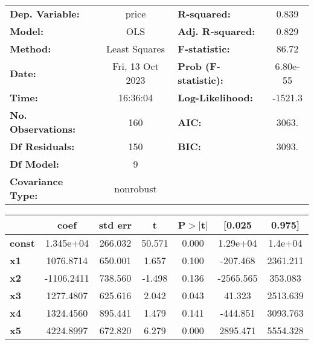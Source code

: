 \begin{center}
\begin{tabular}{lclc}
\toprule
\textbf{Dep. Variable:}    &      price       & \textbf{  R-squared:         } &     0.839   \\
\textbf{Model:}            &       OLS        & \textbf{  Adj. R-squared:    } &     0.829   \\
\textbf{Method:}           &  Least Squares   & \textbf{  F-statistic:       } &     86.72   \\
\textbf{Date:}             & Fri, 13 Oct 2023 & \textbf{  Prob (F-statistic):} &  6.80e-55   \\
\textbf{Time:}             &     16:36:04     & \textbf{  Log-Likelihood:    } &   -1521.3   \\
\textbf{No. Observations:} &         160      & \textbf{  AIC:               } &     3063.   \\
\textbf{Df Residuals:}     &         150      & \textbf{  BIC:               } &     3093.   \\
\textbf{Df Model:}         &           9      & \textbf{                     } &             \\
\textbf{Covariance Type:}  &    nonrobust     & \textbf{                     } &             \\
\bottomrule
\end{tabular}
\begin{tabular}{lcccccc}
               & \textbf{coef} & \textbf{std err} & \textbf{t} & \textbf{P$> |$t$|$} & \textbf{[0.025} & \textbf{0.975]}  \\
\midrule
\textbf{const} &    1.345e+04  &      266.032     &    50.571  &         0.000        &     1.29e+04    &      1.4e+04     \\
\textbf{x1}    &    1076.8714  &      650.001     &     1.657  &         0.100        &     -207.468    &     2361.211     \\
\textbf{x2}    &   -1106.2411  &      738.560     &    -1.498  &         0.136        &    -2565.565    &      353.083     \\
\textbf{x3}    &    1277.4807  &      625.616     &     2.042  &         0.043        &       41.323    &     2513.639     \\
\textbf{x4}    &    1324.4560  &      895.441     &     1.479  &         0.141        &     -444.851    &     3093.763     \\
\textbf{x5}    &    4224.8997  &      672.820     &     6.279  &         0.000        &     2895.471    &     5554.328     \\

\end{tabular}
\end{center}
